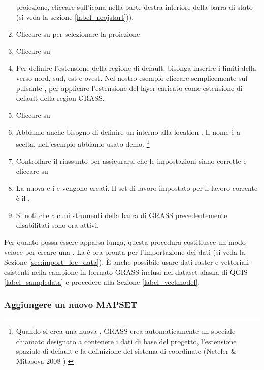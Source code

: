 \begin{enumerate}
  proiezione, cliccare sull'icona   
  nella parte destra inferiore della barra di stato (si veda la sezione \ref{label_projstart})).
  \item Cliccare su  per selezionare la proiezione
  \item Cliccare su  
  \item Per definire l'estensione della regione di default, bisonga inserire i
  limiti della  verso nord, sud, est e ovest. Nel nostro
  esempio cliccare semplicemente sul pulsante , per applicare l'estensione del layer caricato
   come estensione di default della region GRASS.
  \item Cliccare su  
  \item Abbiamo anche bisogno di definire un  interno alla
  location . Il nome è a scelta, nell'esempio abbiamo
  usato demo.
  \footnote{Quando si crea una nuova , GRASS crea
  automaticamente un  speciale chiamato 
  designato a contenere i dati di base del progetto, l'estensione spaziale di
  default e la definizione del sistema di coordinate (Neteler \& Mitasova 2008 
  \cite{neteler_mitasova08}).}
  \item Controllare il riassunto per assicurarsi che le impostazioni siano
  corrette e cliccare su  
  \item La nuova  e i 
  e  vengono creati. Il set di lavoro impostato per il
  lavoro corrente è il .
  \item Si noti che alcuni strumenti della barra di GRASS precedentemente
  disabilitati sono ora attivi.
\end{enumerate}

Per quanto possa essere apparsa lunga, questa procedura costitiusce un modo
veloce per creare una . La  è ora
pronta per l'importazione dei dati (si veda la Sezione \ref{sec:import_loc_data}).
È anche possibile usare dati raster e vettoriali esistenti nella
 campione in formato GRASS inclusi nel dataset
alaska di QGIS \ref{label_sampledata} e procedere alla Sezione \ref{label_vectmodel}.

\subsubsection{Aggiungere un nuovo MAPSET}\label{sec:add_mapset}

